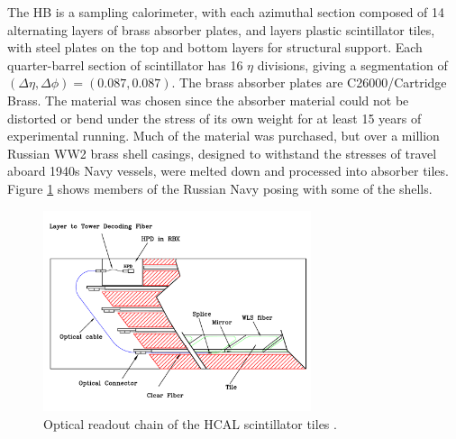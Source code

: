 \par The HB is a sampling calorimeter, with each azimuthal section
composed of 14 alternating layers of brass absorber plates, and layers
plastic scintillator tiles, with steel plates on the top and bottom
layers for structural support.  Each quarter-barrel section of
scintillator has 16 $\eta$ divisions, giving a segmentation of
$(\Delta\eta, \Delta\phi) = (0.087, 0.087)$.  The brass absorber
plates are C26000/Cartridge Brass.  The material was chosen since the
absorber material could not be distorted or bend under the stress of
its own weight for at least 15 years of experimental running.  Much of
the material was purchased, but over a million Russian WW2 brass shell
casings, designed to withstand the stresses of travel aboard 1940s
Navy vessels, were melted down and processed into absorber tiles.
Figure \ref{fig:hcal_navy_shells} shows members of the Russian Navy
posing with some of the shells. 

\begin{figure}[h]
   \centering
  \includegraphics[width=0.7\textwidth]{Figures/CMS_Diagrams/HCAL__OpticalReadout.pdf}
  \caption{Optical readout chain of the HCAL scintillator tiles
    \cite{CMS:CMS_Machine_Chatrchyan:2008aa}. } \label{fig:hcal_navy_shells}
\end{figure}

